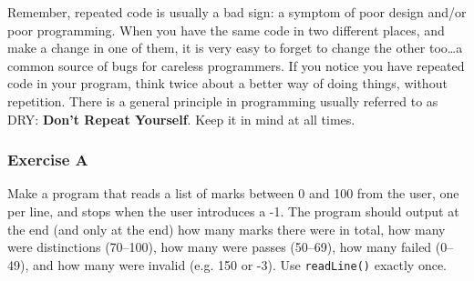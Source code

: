 Remember, repeated code is usually a bad sign: a symptom of poor
design and/or poor programming. When you have the same code in two
different places, and make a change in one of them, it is very easy to
forget to change the other too\ldots a common source of bugs for
careless programmers. If you notice you have repeated code in your
program, think twice about a better way of doing things, without
repetition. There is a general principle in programming usually
referred to as DRY: \textbf{Don't Repeat Yourself}. Keep it in mind at
all times.


\subsubsection*{Exercise A}

Make a program that reads a list of marks between 0 and 100 from the
user, one per line, and stops when the user introduces a -1. The
program should output at the end (and only at the end) how many marks
there were in total, how many were distinctions (70--100), how many
were passes (50--69), how many failed (0--49), and how many were
invalid (e.g. 150 or -3). Use \texttt{readLine()} exactly once.




